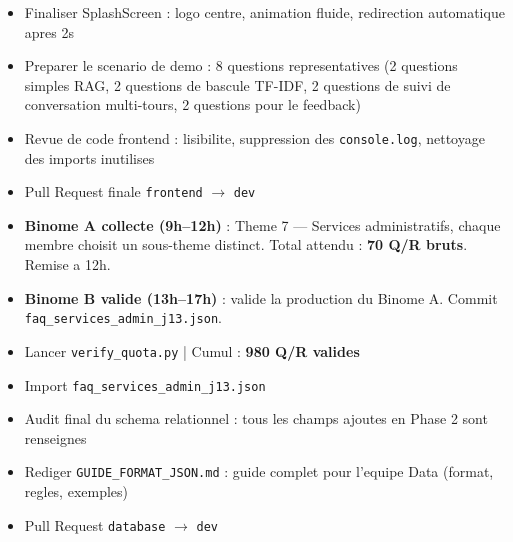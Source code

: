 \documentclass[11pt,a4paper]{article}
\begin{document}
\begin{reactbox}[Frontend --- J13]
\begin{itemize}
    \item[$\square$] Finaliser SplashScreen : logo centre, animation fluide, redirection automatique apres 2s
    \item[$\square$] Preparer le scenario de demo : 8 questions representatives (2 questions simples RAG, 2 questions de bascule TF-IDF, 2 questions de suivi de conversation multi-tours, 2 questions pour le feedback)
    \item[$\square$] Revue de code frontend : lisibilite, suppression des \texttt{console.log}, nettoyage des imports inutilises
    \item[$\square$] Pull Request finale \texttt{frontend} $\rightarrow$ \texttt{dev}
\end{itemize}
\end{reactbox}

\begin{databox}[Data --- J13]
\begin{itemize}
    \item[$\square$] \textbf{Binome A collecte (9h--12h)} : Theme 7 --- Services administratifs, chaque membre choisit un sous-theme distinct. Total attendu : \textbf{70 Q/R bruts}. Remise a 12h.
    \item[$\square$] \textbf{Binome B valide (13h--17h)} : valide la production du Binome A. Commit \texttt{faq\_services\_admin\_j13.json}.
    \item[$\square$] Lancer \texttt{verify\_quota.py} | Cumul : \textbf{980 Q/R valides}
\end{itemize}
\end{databox}

\begin{dbbox}
\begin{itemize}
    \item[$\square$] Import \texttt{faq\_services\_admin\_j13.json}
    \item[$\square$] Audit final du schema relationnel : tous les champs ajoutes en Phase 2 sont renseignes
    \item[$\square$] Rediger \texttt{GUIDE\_FORMAT\_JSON.md} : guide complet pour l'equipe Data (format, regles, exemples)
    \item[$\square$] Pull Request \texttt{database} $\rightarrow$ \texttt{dev}
\end{itemize}
\end{dbbox}
\end{document}
